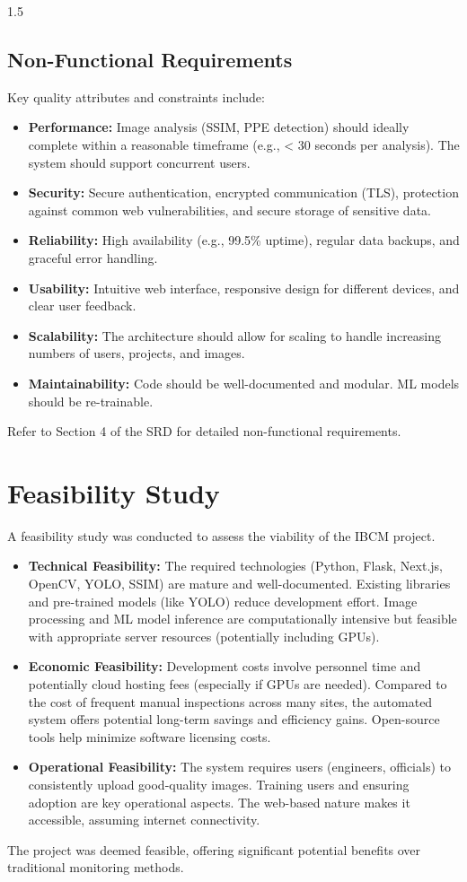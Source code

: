 \documentclass[12pt,a4paper]{report}
\begin{document}
\begin{spacing}{1.5}
    \subsection{Non-Functional Requirements}
    Key quality attributes and constraints include:
    \begin{itemize}
        \item \textbf{Performance:} Image analysis (SSIM, PPE detection) should ideally complete within a reasonable timeframe (e.g., < 30 seconds per analysis). The system should support concurrent users.
        \item \textbf{Security:} Secure authentication, encrypted communication (TLS), protection against common web vulnerabilities, and secure storage of sensitive data.
        \item \textbf{Reliability:} High availability (e.g., 99.5\% uptime), regular data backups, and graceful error handling.
        \item \textbf{Usability:} Intuitive web interface, responsive design for different devices, and clear user feedback.
        \item \textbf{Scalability:} The architecture should allow for scaling to handle increasing numbers of users, projects, and images.
        \item \textbf{Maintainability:} Code should be well-documented and modular. ML models should be re-trainable.
    \end{itemize}
    Refer to Section 4 of the SRD \cite{SRD_IBCM} for detailed non-functional requirements.

    \section{Feasibility Study}
    A feasibility study was conducted to assess the viability of the IBCM project.
    \begin{itemize}
        \item \textbf{Technical Feasibility:} The required technologies (Python, Flask, Next.js, OpenCV, YOLO, SSIM) are mature and well-documented. Existing libraries and pre-trained models (like YOLO) reduce development effort. Image processing and ML model inference are computationally intensive but feasible with appropriate server resources (potentially including GPUs).
        \item \textbf{Economic Feasibility:} Development costs involve personnel time and potentially cloud hosting fees (especially if GPUs are needed). Compared to the cost of frequent manual inspections across many sites, the automated system offers potential long-term savings and efficiency gains. Open-source tools help minimize software licensing costs.
        \item \textbf{Operational Feasibility:} The system requires users (engineers, officials) to consistently upload good-quality images. Training users and ensuring adoption are key operational aspects. The web-based nature makes it accessible, assuming internet connectivity.
    \end{itemize}
    The project was deemed feasible, offering significant potential benefits over traditional monitoring methods.


\end{spacing}
\end{document}
